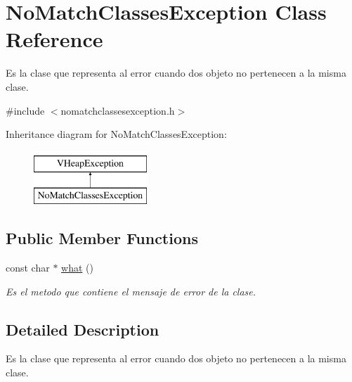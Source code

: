 \hypertarget{class_no_match_classes_exception}{\section{No\-Match\-Classes\-Exception Class Reference}
\label{class_no_match_classes_exception}
}


Es la clase que representa al error cuando dos objeto no pertenecen a la misma clase.  




{\ttfamily \#include $<$nomatchclassesexception.\-h$>$}

Inheritance diagram for No\-Match\-Classes\-Exception\-:\begin{figure}[H]
\begin{center}
\leavevmode
\includegraphics[height=2.000000cm]{class_no_match_classes_exception}
\end{center}
\end{figure}
\subsection*{Public Member Functions}
\begin{DoxyCompactItemize}
\item 
const char $\ast$ \hyperlink{class_no_match_classes_exception_a1dc1f5956c7e6c2a9211432471a60e6d}{what} ()
\begin{DoxyCompactList}\small\item\em Es el metodo que contiene el mensaje de error de la clase. \end{DoxyCompactList}\end{DoxyCompactItemize}


\subsection{Detailed Description}
Es la clase que representa al error cuando dos objeto no pertenecen a la misma clase. 

